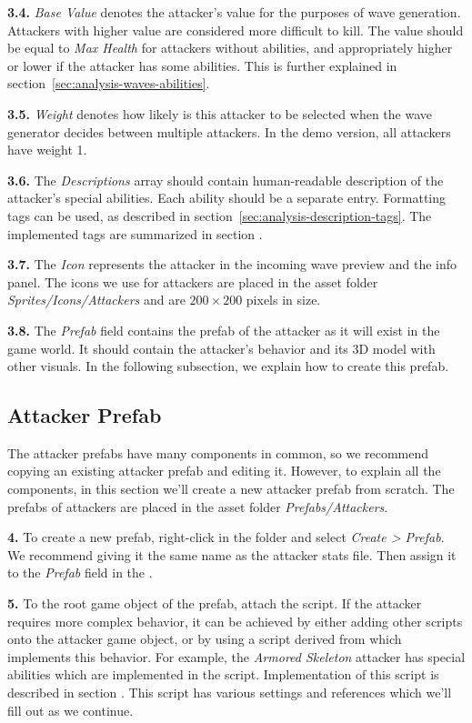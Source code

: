 \textbf{3.4.}
\emph{Base Value} denotes the attacker's value for the purposes of wave generation.
Attackers with higher value are considered more difficult to kill.
The value should be equal to \emph{Max Health} for attackers without abilities, and appropriately higher or lower if the attacker has some abilities.
This is further explained in section~\ref{sec:analysis-waves-abilities}.

\textbf{3.5.}
\emph{Weight} denotes how likely is this attacker to be selected when the wave generator decides between multiple attackers.
In the demo version, all attackers have weight 1.

\textbf{3.6.}
The \emph{Descriptions} array should contain human-readable description of the attacker's special abilities.
Each ability should be a separate entry.
Formatting tags can be used, as described in section~\ref{sec:analysis-description-tags}.
The implemented tags are summarized in section .

\textbf{3.7.}
The \emph{Icon} represents the attacker in the incoming wave preview and the info panel.
The icons we use for attackers are placed in the asset folder \emph{Sprites/Icons/Attackers} and are $200\times200$ pixels in size.

\textbf{3.8.}
The \emph{Prefab} field contains the prefab of the attacker as it will exist in the game world.
It should contain the attacker's behavior and its 3D model with other visuals.
In the following subsection, we explain how to create this prefab.

\subsection{Attacker Prefab}

The attacker prefabs have many components in common, so we recommend copying an existing attacker prefab and editing it.
However, to explain all the components, in this section we'll create a new attacker prefab from scratch.
The prefabs of attackers are placed in the asset folder \emph{Prefabs/Attackers}.

\textbf{4.}
To create a new prefab, right-click in the folder and select \emph{Create > Prefab}.
We recommend giving it the same name as the attacker stats file.
Then assign it to the \emph{Prefab} field in the .

\textbf{5.}
To the root game object of the prefab, attach the  script.
If the attacker requires more complex behavior, it can be achieved by either adding other scripts onto the attacker game object, or by using a script derived from  which implements this behavior.
For example, the \emph{Armored Skeleton} attacker has special abilities which are implemented in the  script.
Implementation of this script is described in section .
This script has various settings and references which we'll fill out as we continue.

